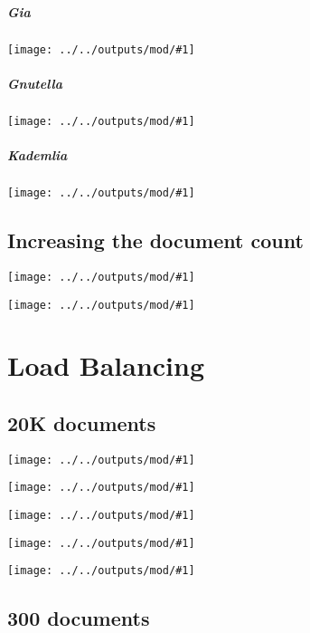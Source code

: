 \documentclass[longdoc,nochapterpage,colorbacktitle,accentcolor=tud1b,11pt,paper=a4]{tudreport}
\newcommand{\imga}[2]{
  \texttt{[image: ../../outputs/mod/\#1]}
}
\begin{document}
% 

	  \paragraph{Gia}

	  \imga{msgs_fs_gia}{.85}

	  \paragraph{Gnutella}

	  \imga{msgs_fs_gnutella}{.85}

	  \paragraph{Kademlia}

	  \imga{msgs_fs_kademlia}{.85}

	  \section{Increasing the document count}

	  \imga{scal_avgNHopsWithDocType}{.55}

	  \imga{scal_qSuccessWithDocType}{.55}

	\chapter{Load Balancing}

	  \section{20K documents}

	  \imga{loadBal_downBWConsPerHost_10000}{.85}

	  \imga{loadBal_downBWPerHost_10000}{.85}

	  \imga{loadBal_staleBWPerHost_10000}{.85}

	  \imga{loadBal_upBWConsPerHost_10000}{.85}

	  \imga{loadBal_upBWPerHost_10000}{.85}

	  \section{300 documents}
\end{document}
